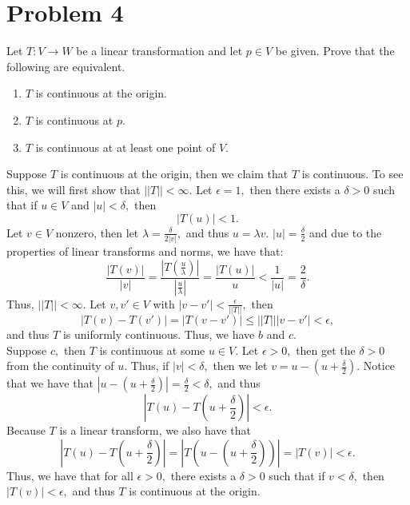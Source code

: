 \documentclass[11pt]{article}
\begin{document}
\newpage
\section*{Problem 4}
\begin{problem}
    Let $T: V \to W$ be a linear transformation and let $p \in V$ be given. Prove that the following are equivalent.
    \begin{enumerate}
        \item $T$ is continuous at the origin.
        \item $T$ is continuous at $p.$
        \item $T$ is continuous at at least one point of $V.$
    \end{enumerate}
\end{problem}
\begin{solution}
    Suppose $T$ is continuous at the origin, then we claim that $T$ is continuous. To see this, we will first show that $||T||< \infty.$ Let $\epsilon = 1,$ then there exists a $\delta>0$ such that if $u \in V$ and $|u|< \delta,$ then 
    \[|T(u)|<1.\] Let $v \in V$ nonzero, then let $\lambda = \frac{\delta}{2|v|},$ and thus $u = \lambda v.$
    $|u| = \frac{\delta}{2}$ and due to the properties of linear transforms and norms, we have that:
    \[\frac{|T(v)|}{|v|} = \frac{|T(\frac{u}{\lambda})|}{|\frac{u}{\lambda}|} = \frac{|T(u)|}{u}< \frac{1}{|u|} = \frac{2}{\delta}.\] Thus, $||T||< \infty.$ Let $v, v' \in V$ with $|v-v'|< \frac{\epsilon}{||T||},$ then 
    \[|T(v) - T(v')| = |T(v-v')|\leq ||T|||v-v'|< \epsilon,\] and thus $T$ is uniformly continuous. Thus, we have $b$ and $c.$\\

    Suppose $c,$ then $T$ is continuous at some $u \in V.$ Let $\epsilon>0,$ then get the $\delta>0$ from the continuity of $u.$ Thus, if $|v|< \delta,$ then we let $v = u - (u + \frac{\delta}{2}).$ Notice that 
    we have that $|u - (u + \frac{\delta}{2})| = \frac{\delta}{2}< \delta,$ and thus 
    \[|T(u) - T(u + \frac{\delta}{2})| < \epsilon.\] Because $T$ is a linear transform, we also have that 
    \[|T(u) - T(u + \frac{\delta}{2})| = |T(u - (u + \frac{\delta}{2}))| = |T(v)|< \epsilon.\] Thus, we have that for all $\epsilon>0,$ there exists a $\delta>0$ such that if $v < \delta,$ then $|T(v)|< \epsilon,$ and thus $T$ is continuous at the origin.
\end{solution}

\newpage
\end{document}
